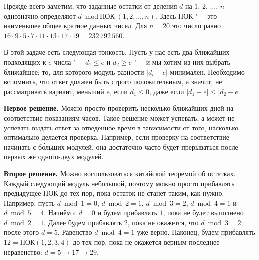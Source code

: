 Прежде всего заметим, что заданные остатки от деления $d$ на
$1$, $2$, $\ldots$, $n$ однозначно определяют
$d \bmod \text{НОК} (1, 2, \ldots, n)$.
Здесь НОК "--- это наименьшее общее кратное данных чисел.
Для $n = 20$ это число равно $16 \cdot 9 \cdot 5 \cdot 7 \cdot
11 \cdot 13 \cdot 17 \cdot 19 = 232\,792\,560$.

В этой задаче есть следующая тонкость.
Пусть у нас есть два ближайших подходящих к $e$ числа "---
$d_1 \le e$ и $d_2 \ge e$ "--- и мы хотим из них выбрать ближайшее:
то, для которого модуль разности $|d_i - e|$ минимален.
Необходимо вспомнить, что ответ должен быть строго положительным,
а значит, не рассматривать вариант, меньший $e$, если $d_1 \le 0$,
даже если $|d_1 - e| \le |d_2 - e|$.

\textbf{Первое решение.}
Можно просто проверить несколько ближайших дней
на соответствие показаниям часов.
Такое решение может успевать, а может не успевать выдать ответ
за отведённое время в зависимости от того, насколько оптимально
делается проверка.
Например, если проверку на соответствие начинать с б\'{о}льших модулей,
она достаточно часто будет прерываться после первых же одного-двух модулей.

\textbf{Второе решение.}
Можно воспользоваться китайской теоремой об остатках.
Каждый следующий модуль небольшой, поэтому можно просто прибавлять
предыдущее НОК до тех пор, пока остаток не станет таким, как нужно.
Например, пусть $d \bmod 1 = 0$, $d \bmod 2 = 1$, $d \bmod 3 = 2$,
$d \bmod 4 = 1$ и $d \bmod 5 = 4$.
Начнём с $d = 0$ и будем прибавлять $1$, пока не будет выполнено
$d \bmod 2 = 1$.
Далее будем прибавлять $2$, пока не окажется, что $d \bmod 3 = 2$;
после этого $d = 5$.
Равенство $d \bmod 4 = 1$ уже верно.
Наконец, будем прибавлять $12 = \text{НОК} (1, 2, 3, 4)$
до тех пор, пока не окажется верным последнее неравенство:
$d = 5 \rightarrow 17 \rightarrow 29$.
